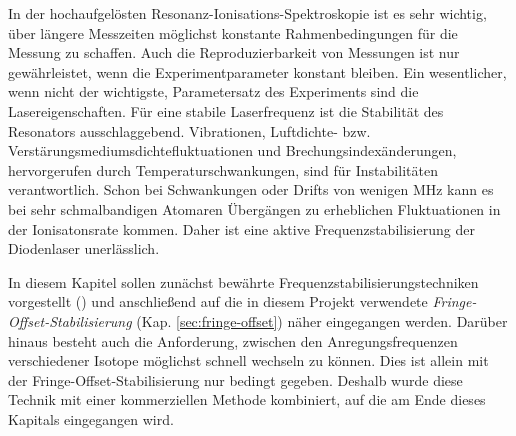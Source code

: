 In der hochaufgelösten Resonanz-Ionisations-Spektroskopie ist es
sehr wichtig, über längere Messzeiten möglichst konstante Rahmenbedingungen für die Messung zu
schaffen. Auch die Reproduzierbarkeit von Messungen ist nur gewährleistet, wenn
die Experimentparameter konstant bleiben. Ein wesentlicher, wenn nicht der
wichtigste, Parametersatz des Experiments sind die Lasereigenschaften. Für
eine stabile Laserfrequenz ist die Stabilität des Resonators ausschlaggebend.
Vibrationen, Luftdichte- bzw. Verstärungsmediumsdichtefluktuationen und
Brechungsindexänderungen, hervorgerufen durch Temperaturschwankungen, sind für
Instabilitäten verantwortlich. Schon bei Schwankungen oder Drifts von wenigen
MHz kann es bei sehr schmalbandigen Atomaren Übergängen zu erheblichen
Fluktuationen in der Ionisatonsrate kommen. Daher ist eine aktive
Frequenzstabilisierung der Diodenlaser unerlässlich.\par
In diesem Kapitel sollen zunächst bewährte Frequenzstabilisierungstechniken
vorgestellt (\cite{noertershaeuser:physik_des_lasers}) und anschließend auf die
in diesem Projekt verwendete \textit{Fringe-Offset-Stabilisierung}
(Kap. \ref{sec:fringe-offset}) näher eingegangen werden. Darüber hinaus besteht
auch die Anforderung, zwischen den Anregungsfrequenzen verschiedener Isotope möglichst schnell wechseln zu können. Dies ist allein mit der
Fringe-Offset-Stabilisierung nur bedingt gegeben. Deshalb wurde diese
Technik mit einer kommerziellen Methode kombiniert, auf die am Ende dieses
Kapitals eingegangen wird.

\section{}